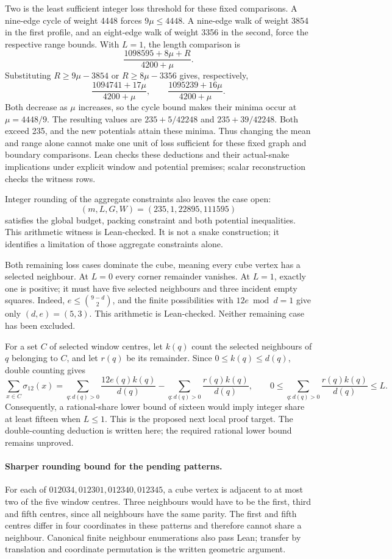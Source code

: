 \documentclass[11pt,a4paper]{article}
\begin{document}
Two is the least sufficient integer loss threshold for these fixed
comparisons. A nine-edge cycle of weight 4448 forces $9\mu\le4448$.
A nine-edge walk of weight 3854 in the first profile, and an eight-edge
walk of weight 3356 in the second, force the respective range bounds.
With $L=1$, the length comparison is
\[
\frac{1098595+8\mu+R}{4200+\mu}.
\]
Substituting $R\ge9\mu-3854$ or $R\ge8\mu-3356$ gives, respectively,
\[
\frac{1094741+17\mu}{4200+\mu},\qquad
\frac{1095239+16\mu}{4200+\mu}.
\]
Both decrease as $\mu$ increases, so the cycle bound makes their minima
occur at $\mu=4448/9$. The resulting values are
$235+5/42248$ and $235+39/42248$. Both exceed 235, and the new potentials
attain these minima. Thus changing the mean and range alone cannot make
one unit of loss sufficient for these fixed graph and boundary comparisons. Lean checks
these deductions and their actual-snake implications under explicit window
and potential premises; scalar reconstruction checks the witness rows.

Integer rounding of the aggregate constraints also leaves the case open:
\[
(m,L,G,W)=(235,1,22895,111595)
\]
satisfies the global budget, packing constraint and both potential
inequalities. This arithmetic witness is Lean-checked. It is not a
snake construction; it identifies a limitation of those aggregate
constraints alone.

Both remaining loss cases dominate the cube, meaning every cube vertex
has a selected neighbour. At $L=0$ every corner
remainder vanishes. At $L=1$, exactly one is positive; it must have
five selected neighbours and three incident empty squares. Indeed,
$e\le\binom{9-d}{2}$, and the finite possibilities with
$12e\bmod d=1$ give only $(d,e)=(5,3)$. This arithmetic is Lean-checked.
Neither remaining case has been excluded.

For a set $C$ of selected window centres, let $k(q)$ count the selected
neighbours of $q$ belonging to $C$, and let $r(q)$ be its remainder.
Since $0\le k(q)\le d(q)$, double counting gives
\[
\sum_{x\in C}\sigma_{12}(x)
=\sum_{q:d(q)>0}\frac{12e(q)k(q)}{d(q)}
-\sum_{q:d(q)>0}\frac{r(q)k(q)}{d(q)},
\qquad
0\le\sum_{q:d(q)>0}\frac{r(q)k(q)}{d(q)}\le L.
\]
Consequently, a rational-share lower bound of sixteen would imply integer
share at least fifteen when $L\le1$. This is the proposed next local
proof target. The double-counting deduction is written here; the required
rational lower bound remains unproved.

\paragraph{Sharper rounding bound for the pending patterns.}
For each of $012034,012301,012340,012345$, a cube vertex is adjacent to
at most two of the five window centres. Three neighbours would have to
be the first, third and fifth centres, since all neighbours have the same
parity. The first and fifth centres differ in four coordinates in these
patterns and therefore cannot share a neighbour. Canonical finite
neighbour enumerations also pass Lean; transfer by translation and
coordinate permutation is the written geometric argument.
\end{document}
